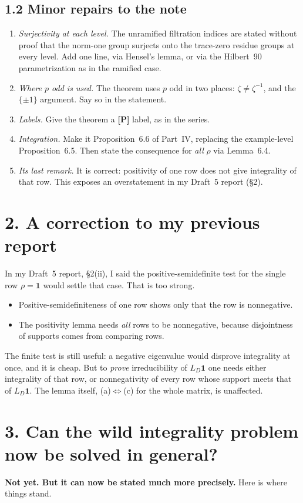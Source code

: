 \documentclass[11pt]{article}
\theoremstyle{plain}
\begin{document}
\subsection*{1.2 Minor repairs to the note}
\begin{enumerate}[label=(\arabic*)]
\item \emph{Surjectivity at each level.} The unramified filtration
indices are stated without proof that the norm-one group surjects onto
the trace-zero residue groups at every level. Add one line, via Hensel's
lemma, or via the Hilbert~90 parametrization as in the ramified case.
\item \emph{Where $p$ odd is used.} The theorem uses $p$ odd in two
places: $\zeta\ne\zeta^{-1}$, and the $\{\pm1\}$ argument. Say so in the
statement.
\item \emph{Labels.} Give the theorem a \textbf{[P]} label, as in the
series.
\item \emph{Integration.} Make it Proposition~6.6 of Part~IV, replacing
the example-level Proposition~6.5. Then state the consequence for
\emph{all} $\rho$ via Lemma~6.4.
\item \emph{Its last remark.} It is correct: positivity of one row does
not give integrality of that row. This exposes an overstatement in my
Draft~5 report (\S2).
\end{enumerate}

\section*{2. A correction to my previous report}
In my Draft~5 report, \S2(ii), I said the positive-semidefinite test for
the single row $\rho=\mathbf1$ would settle that case. That is too
strong.
\begin{itemize}
\item Positive-semidefiniteness of one row shows only that the row is
nonnegative.
\item The positivity lemma needs \emph{all} rows to be nonnegative,
because disjointness of supports comes from comparing rows.
\end{itemize}
The finite test is still useful: a negative eigenvalue would disprove
integrality at once, and it is cheap. But to \emph{prove}
irreducibility of $L_D\mathbf1$ one needs either integrality of that
row, or nonnegativity of every row whose support meets that of
$L_D\mathbf1$. The lemma itself, (a)$\Leftrightarrow$(c) for the whole
matrix, is unaffected.

\section*{3. Can the wild integrality problem now be solved in general?}
\textbf{Not yet. But it can now be stated much more precisely.} Here is
where things stand.
\end{document}
